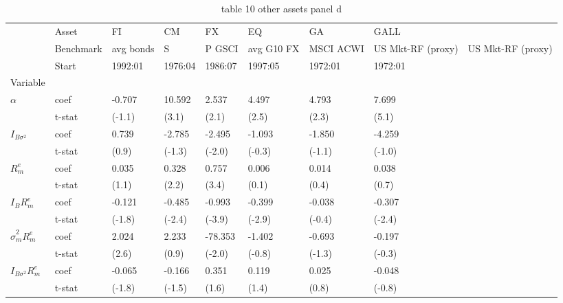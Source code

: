 \begin{table}[htbp]
  \centering
  \caption{table 10 other assets panel d}
  \label{tab:table_10_other_assets_panel_d}
  \begin{tabular}{llllllll}
\toprule
 & Asset & FI & CM & FX & EQ & GA & GALL \\
 & Benchmark & avg bonds & S&P GSCI & avg G10 FX & MSCI ACWI & US Mkt-RF (proxy) & US Mkt-RF (proxy) \\
 & Start & 1992:01 & 1976:04 & 1986:07 & 1997:05 & 1972:01 & 1972:01 \\
Variable &  &  &  &  &  &  &  \\
\midrule
{} & coef & -0.707 & 10.592 & 2.537 & 4.497 & 4.793 & 7.699 \\
 & t-stat & (-1.1) & (3.1) & (2.1) & (2.5) & (2.3) & (5.1) \\
 & coef & 0.739 & -2.785 & -2.495 & -1.093 & -1.850 & -4.259 \\
 & t-stat & (0.9) & (-1.3) & (-2.0) & (-0.3) & (-1.1) & (-1.0) \\
 & coef & 0.035 & 0.328 & 0.757 & 0.006 & 0.014 & 0.038 \\
 & t-stat & (1.1) & (2.2) & (3.4) & (0.1) & (0.4) & (0.7) \\
 & coef & -0.121 & -0.485 & -0.993 & -0.399 & -0.038 & -0.307 \\
 & t-stat & (-1.8) & (-2.4) & (-3.9) & (-2.9) & (-0.4) & (-2.4) \\
 & coef & 2.024 & 2.233 & -78.353 & -1.402 & -0.693 & -0.197 \\
 & t-stat & (2.6) & (0.9) & (-2.0) & (-0.8) & (-1.3) & (-0.3) \\
 & coef & -0.065 & -0.166 & 0.351 & 0.119 & 0.025 & -0.048 \\
 & t-stat & (-1.8) & (-1.5) & (1.6) & (1.4) & (0.8) & (-0.8) \\
\bottomrule
\end{tabular}

\end{table}
